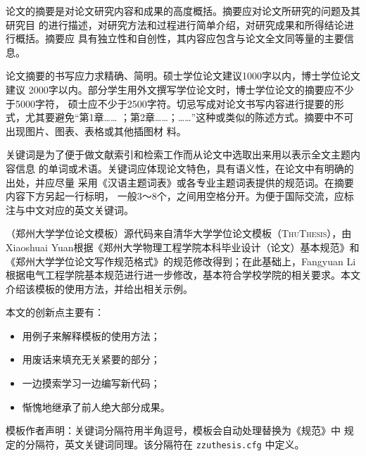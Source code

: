 \begin{cabstract}

论文的摘要是对论文研究内容和成果的高度概括。摘要应对论文所研究的问题及其研究目
的进行描述，对研究方法和过程进行简单介绍，对研究成果和所得结论进行概括。摘要应
具有独立性和自创性，其内容应包含与论文全文同等量的主要信息。

论文摘要的书写应力求精确、简明。硕士学位论文建议1000字以内，博士学位论文建议
2000字以内。部分学生用外文撰写学位论文时，博士学位论文的摘要应不少于5000字符，
硕士应不少于2500字符。切忌写成对论文书写内容进行提要的形式，尤其要避免“第1章……
；第2章……；……”这种或类似的陈述方式。摘要中不可出现图片、图表、表格或其他插图材
料。

关键词是为了便于做文献索引和检索工作而从论文中选取出来用以表示全文主题内容信息
的单词或术语。关键词应体现论文特色，具有语义性，在论文中有明确的出处，并应尽量
采用《汉语主题词表》或各专业主题词表提供的规范词。在摘要内容下方另起一行标明，
一般3～8个，之间用空格分开。为便于国际交流，应标注与中文对应的英文关键词。

\zzuthesis{}（郑州大学学位论文模板）源代码来自清华大学学位论文模板（\textsc{ThuThesis}），由Xiaoshuai Yuan根据《郑州大学物理工程学院本科毕业设计（论文）基本规范》和《郑州大学学位论文写作规范格式》的规范修改得到；在此基础上，Fangyuan Li根据电气工程学院基本规范进行进一步修改，基本符合学校学院的相关要求。本文介绍该模板的使用方法，并给出相关示例。

本文的创新点主要有：
  \begin{itemize}
    \item 用例子来解释模板的使用方法；
    \item 用废话来填充无关紧要的部分；
    \item 一边摸索学习一边编写新代码；
    \item 惭愧地继承了前人绝大部分成果。
  \end{itemize}

\textsf{模板作者声明}：关键词分隔符用半角逗号，模板会自动处理替换为《规范》中
规定的分隔符，英文关键词同理。该分隔符在 \verb|zzuthesis.cfg| 中定义。


\end{cabstract}

